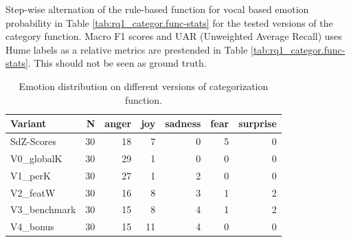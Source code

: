 Step-wise alternation of the rule-based function for vocal based emotion probability in Table \ref{tab:rq1_categor.func-stats} for the tested versions of the category function. 
Macro F1 scores and UAR (Unweighted Average Recall) uses Hume labels as a relative metrics are prestended in Table \ref{tab:rq1_categor.func-stats}. This should not be seen as ground truth. 

\begin{table}[ht]
  \centering
  \begin{tabular}{lrrrrrr}
    \toprule
    Variant      &  N & anger & joy & sadness & fear & surprise \\
    \midrule
    SdZ-Scores   & 30 &    18 &   7 &       0 &    5 &        0 \\
    V0\_globalK  & 30 &    29 &   1 &       0 &    0 &        0 \\
    V1\_perK     & 30 &    27 &   1 &       2 &    0 &        0 \\
    V2\_featW   & 30 &    16 &   8 &       3 &    1 &        2 \\
    V3\_benchmark    & 30 &    15 &   8 &       4 &    1 &        2 \\
    V4\_bonus & 30 &    15 &   11 &       4 &    0 &        0 \\
    \bottomrule
  \end{tabular}
  \caption{Emotion distribution on different versions of categorization function.}
  \label{tab:rq1_emotion-cat-labels}
\end{table}

